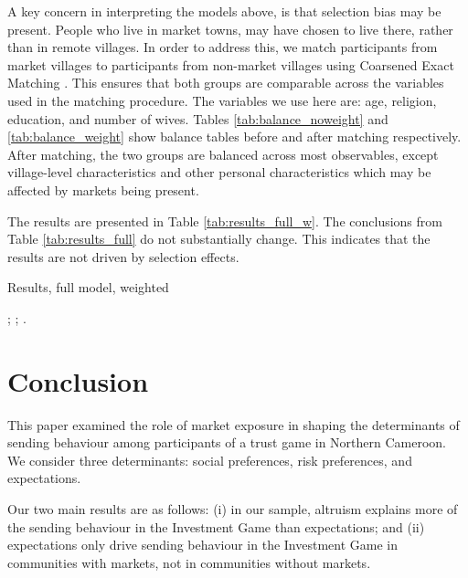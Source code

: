 A key concern in interpreting the models above, is that selection bias may be present. People who live in market towns, may have chosen to live there, rather than in remote villages. In order to address this, we match participants from market villages to participants from non-market villages using Coarsened Exact Matching \citep{Blackwell2010}. This ensures that both groups are comparable across the variables used in the matching procedure. The variables we use here are: age, religion, education, and number of wives. Tables \ref{tab:balance_noweight} and \ref{tab:balance_weight} show balance tables before and after matching respectively. After matching, the two groups are balanced across most observables, except village-level characteristics and other personal characteristics which may be affected by markets being present.

The results are presented in Table \ref{tab:results_full_w}. The conclusions from Table \ref{tab:results_full} do not substantially change. This indicates that the results are not driven by selection effects.

\begin{threeparttable}[htb]
	\small
	\caption{Results, full model, weighted}
	\label{tab:results_full_w}
	\centering
	
	\begin{tablenotes}
		\footnotesize
		\item \camsig; \camcluster; \camcontrols.
		\item
	\end{tablenotes}
\end{threeparttable}

\section{Conclusion}
This paper examined the role of market exposure in shaping the determinants of sending behaviour among participants of a trust game in Northern Cameroon. We consider three determinants: social preferences, risk preferences, and expectations. 

Our two main results are as follows: (i) in our sample, altruism explains more of the sending behaviour in the Investment Game than expectations; and (ii) expectations only drive sending behaviour in the Investment Game in communities with markets, not in communities without markets.  

